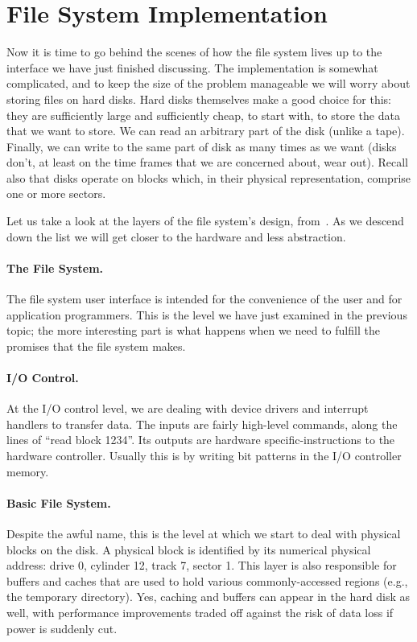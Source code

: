 




\section*{File System Implementation}
Now it is time to go behind the scenes of how the file system lives up to the interface we have just finished discussing. The implementation is somewhat complicated, and to keep the size of the problem manageable we will worry about storing files on hard disks. Hard disks themselves make a good choice for this: they are sufficiently large and sufficiently cheap, to start with, to store the data that we want to store. We can read an arbitrary part of the disk (unlike a tape). Finally, we can write to the same part of disk as many times as we want (disks don't, at least on the time frames that we are concerned about, wear out). Recall also that disks operate on blocks which, in their physical representation, comprise one or more sectors.

Let us take a look at the layers of the file system's design, from~\cite{osc}. As we descend down the list we will get closer to the hardware and less abstraction.

\paragraph{The File System.} The file system user interface is intended for the convenience of the user and for application programmers. This is the level we have just examined in the previous topic; the more interesting part is what happens when we need to fulfill the promises that the file system makes.

\paragraph{I/O Control.} At the I/O control level, we are dealing with device drivers and interrupt handlers to transfer data. The inputs are fairly high-level commands, along the lines of ``read block 1234''. Its outputs are hardware specific-instructions to the hardware controller. Usually this is by writing bit patterns in the I/O controller memory.

\paragraph{Basic File System.} Despite the awful name, this is the level at which we start to deal with physical blocks on the disk. A physical block is identified by its numerical physical address: drive 0, cylinder 12, track 7, sector 1. This layer is also responsible for buffers and caches that are used to hold various commonly-accessed regions (e.g., the temporary directory). Yes, caching and buffers can appear in the hard disk as well, with performance improvements traded off against the risk of data loss if power is suddenly cut.

